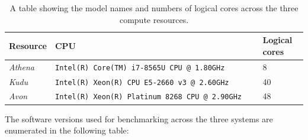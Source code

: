\begin{table}[H]
    \caption{A table showing the model names and numbers of logical cores across the three compute resources.}
    \label{table:compute-resource-cpus}
    \begin{tabular}{|p{0.15\linewidth}||p{0.7\linewidth}|p{0.15\linewidth}|}
    \hline
    \textbf{Resource} & \textbf{CPU}                                            & \textbf{Logical cores} \\ \hline\hline
    \textit{Athena}   & \texttt{Intel(R) Core(TM) i7-8565U CPU @ 1.80GHz}     & 8                      \\ \hline
    \textit{Kudu}     & \texttt{Intel(R) Xeon(R) CPU E5-2660 v3 @ 2.60GHz}    & 40                     \\ \hline
    \textit{Avon}     & \texttt{Intel(R) Xeon(R) Platinum 8268 CPU @ 2.90GHz} & 48                     \\ \hline
    \end{tabular}
\end{table}

The software versions used for benchmarking across the three systems are enumerated in the following table:

